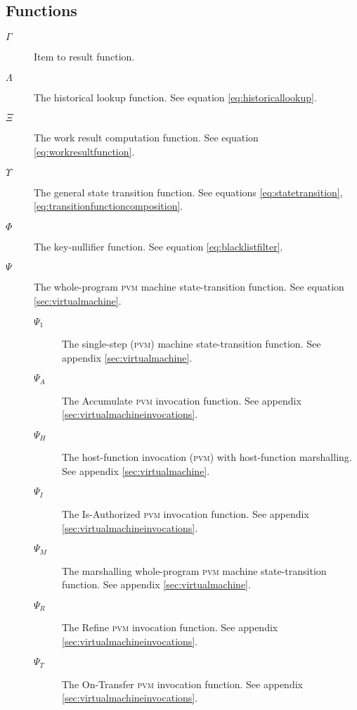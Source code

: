 \subsection{Functions}

\begin{description}
  \item[$\Gamma$] Item to result function. %
  \item[$\Lambda$] The historical lookup function. See equation \ref{eq:historicallookup}. %
  \item[$\Xi$] The work result computation function. See equation \ref{eq:workresultfunction}. %
  \item[$\Upsilon$] The general state transition function. See equations \ref{eq:statetransition}, \ref{eq:transitionfunctioncomposition}. %
  \item[$\Phi$] The key-nullifier function. See equation \ref{eq:blacklistfilter}. %
  \item[$\Psi$] The whole-program \textsc{pvm} machine state-transition function. See equation \ref{sec:virtualmachine}. %
  \begin{description}
    \item[$\Psi_1$] The single-step (\textsc{pvm}) machine state-transition function. See appendix \ref{sec:virtualmachine}. %
    \item[$\Psi_A$] The Accumulate \textsc{pvm} invocation function. See appendix \ref{sec:virtualmachineinvocations}.
    \item[$\Psi_H$] The host-function invocation (\textsc{pvm}) with host-function marshalling. See appendix \ref{sec:virtualmachine}. %
    \item[$\Psi_I$] The Is-Authorized \textsc{pvm} invocation function. See appendix \ref{sec:virtualmachineinvocations}.
    \item[$\Psi_M$] The marshalling whole-program \textsc{pvm} machine state-transition function. See appendix \ref{sec:virtualmachine}. %
    \item[$\Psi_R$] The Refine \textsc{pvm} invocation function. See appendix \ref{sec:virtualmachineinvocations}.
    \item[$\Psi_T$] The On-Transfer \textsc{pvm} invocation function. See appendix \ref{sec:virtualmachineinvocations}.

\end{description}
\end{description}
